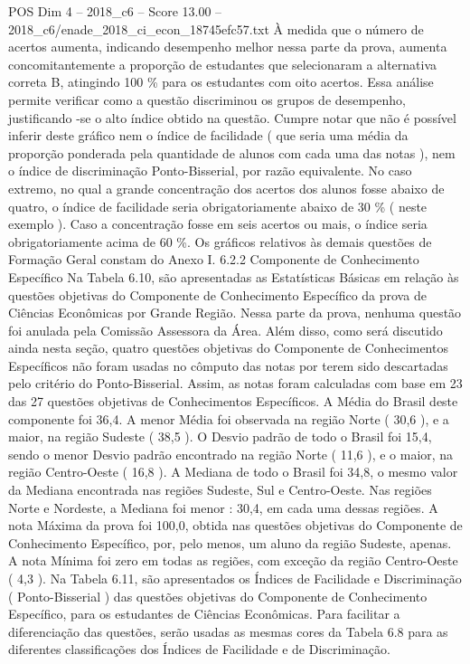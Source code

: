 \begin{textsample}{POS Dim 4 – 2018\_c6 – Score 13.00 – 2018\_c6/enade\_2018\_ci\_econ\_18745efc57.txt}
À medida que o número de acertos aumenta, indicando desempenho melhor nessa parte da prova, aumenta concomitantemente a proporção de estudantes que selecionaram a alternativa correta B, atingindo 100 \% para os estudantes com oito acertos.
Essa análise permite verificar como a questão discriminou os grupos de desempenho, justificando -se o alto índice obtido na questão.
Cumpre notar que não é possível inferir deste gráfico nem o índice de facilidade ( que seria uma média da proporção ponderada pela quantidade de alunos com cada uma das notas ), nem o índice de discriminação Ponto-Bisserial, por razão equivalente.
No caso extremo, no qual a grande concentração dos acertos dos alunos fosse abaixo de quatro, o índice de facilidade seria obrigatoriamente abaixo de 30 \% ( neste exemplo ).
Caso a concentração fosse em seis acertos ou mais, o índice seria obrigatoriamente acima de 60 \%.
Os gráficos relativos às demais questões de Formação Geral constam do Anexo I. 6.2.2 Componente de Conhecimento Específico Na Tabela 6.10, são apresentadas as Estatísticas Básicas em relação às questões objetivas do Componente de Conhecimento Específico da prova de Ciências Econômicas por Grande Região.
Nessa parte da prova, nenhuma questão foi anulada pela Comissão Assessora da Área.
Além disso, como será discutido ainda nesta seção, quatro questões objetivas do Componente de Conhecimentos Específicos não foram usadas no cômputo das notas por terem sido descartadas pelo critério do Ponto-Bisserial.
Assim, as notas foram calculadas com base em 23 das 27 questões objetivas de Conhecimentos Específicos.
A Média do Brasil deste componente foi 36,4.
A menor Média foi observada na região Norte ( 30,6 ), e a maior, na região Sudeste ( 38,5 ).
O Desvio padrão de todo o Brasil foi 15,4, sendo o menor Desvio padrão encontrado na região Norte ( 11,6 ), e o maior, na região Centro-Oeste ( 16,8 ).
A Mediana de todo o Brasil foi 34,8, o mesmo valor da Mediana encontrada nas regiões Sudeste, Sul e Centro-Oeste.
Nas regiões Norte e Nordeste, a Mediana foi menor : 30,4, em cada uma dessas regiões.
A nota Máxima da prova foi 100,0, obtida nas questões objetivas do Componente de Conhecimento Específico, por, pelo menos, um aluno da região Sudeste, apenas.
A nota Mínima foi zero em todas as regiões, com exceção da região Centro-Oeste ( 4,3 ).
Na Tabela 6.11, são apresentados os Índices de Facilidade e Discriminação ( Ponto-Bisserial ) das questões objetivas do Componente de Conhecimento Específico, para os estudantes de Ciências Econômicas.
Para facilitar a diferenciação das questões, serão usadas as mesmas cores da Tabela 6.8 para as diferentes classificações dos Índices de Facilidade e de Discriminação.

\end{textsample}
